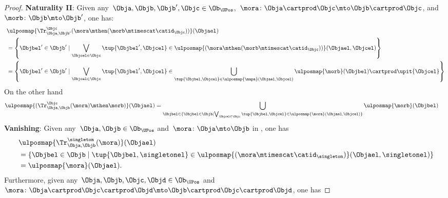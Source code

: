 \begin{proof}
	\textbf{Naturality II}:
	Given any~$\Obja,\Objb,\Objb',\Objc \in \Ob_{\UPos}$,~$\mora\colon \Obja\cartprod \Objc \mto \Objb\cartprod \Objc$, and~$\morb\colon \Objb\mto \Objb'$, one has:
	\begin{equation*}
		\begin{aligned}
			~ & \ulposmap{\Tr_{\Obja,\Objb'}^{\Objc}(\mora \mthen (\morb \mtimescat \catid_\Objc))}(\Objael)                                                                                                                            \\
			  & =
			\left \{\Objbel'\in \Objb' \mid \bigvee_{\Objcel\in \Objc} \tup{\Objbel',\Objcel}\in \ulposmap{(\mora \mthen (\morb \mtimescat \catid_\Objc))}(\Objael,\Objcel)\right\}                                                     \\
			  & =\left\{ \Objbel'\in \Objb'\mid \bigvee_{\Objcel\in \Objc} \tup{\Objbel',\Objcel}\in \bigcup_{\tup{\Objbel,\Objcel}\in \ulposmap{\mapa}(\Objael,\Objcel)} \ulposmap{\morb}(\Objbel) \cartprod \upit\{ \Objcel\}\right\}
		\end{aligned}
	\end{equation*}
	On the other hand
	\begin{equation*}
		\begin{aligned}
			\ulposmap{(\Tr_{\Obja,\Objb}^{\Objc}(\mora)\mthen \morb)}(\Objael) & =
			\bigcup_{\Objbel \in \{ \Objbel \in \Objb \mid \bigvee_{\Objcel \in \Objc}\tup{\Objbel,\Objcel}\in \ulposmap{\mora}(\Objael,\Objcel)\}}\ulposmap{\morb}(\Objbel)
		\end{aligned}
	\end{equation*}
	\textbf{Vanishing}:
	Given any~$\Obja,\Objb\in \Ob_{\UPos}$ and~$\mora\colon \Obja \mto \Objb$ in \UPos, one has
	\begin{equation*}
		\begin{aligned}
			~ & \ulposmap{\Tr_{\Obja,\Objb}^{\singleton}(\mora)}(\Objael)                                                                        \\
			  & =\{\Objbel \in \Objb \mid \tup{\Objbel,\singletonel}\in \ulposmap{(\mora\mtimescat \catid_{\singleton})}(\Objael,\singletonel)\} \\
			  & =\ulposmap{\mora}(\Objael).
		\end{aligned}
	\end{equation*}
	Furthermore, given any~$\Obja,\Objb,\Objc,\Objd \in \Ob_{\UPos}$ and~$\mora\colon \Obja \cartprod \Objc \cartprod \Objd\mto \Objb \cartprod \Objc \cartprod \Objd$, one has

\end{proof}
